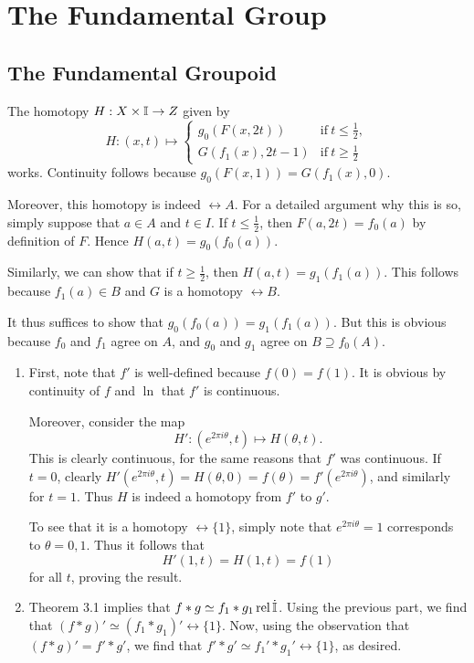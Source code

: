 \documentclass[../../solutions.tex]{subfiles}
\begin{document}
 

\section{The Fundamental Group}
\subsection{The Fundamental Groupoid} 
\begin{exercise} \leavevmode
The homotopy $H:X\times\mathbb I\to Z$ given by \[H:(x,t)\mapsto\begin{cases}g_0(F(x,2t))&\text{if}~t\le\frac12,\\G(f_1(x),2t-1)&\text{if}~t\ge\frac12\end{cases}\] works. Continuity follows because $g_0(F(x,1))=G(f_1(x),0)$. 

Moreover, this homotopy is indeed $\rel A$. For a detailed argument why this is so, simply suppose that $a\in A$ and $t\in I$. If $t\le\frac12$, then $F(a,2t)=f_0(a)$ by definition of $F$. Hence $H(a,t)=g_0(f_0(a))$. 

Similarly, we can show that if $t\ge\frac12$, then $H(a,t)=g_1(f_1(a))$. This follows because $f_1(a)\in B$ and $G$ is a homotopy $\rel B$. 

It thus suffices to show that $g_0(f_0(a))=g_1(f_1(a))$. But this is obvious because $f_0$ and $f_1$ agree on $A$, and $g_0$ and $g_1$ agree on $B\supseteq f_0(A)$. 
\end{exercise} 

\begin{exercise} \leavevmode
\begin{enumerate}
\item First, note that $f'$ is well-defined because $f(0)=f(1)$. It is obvious by continuity of $f$ and $\ln$ that $f'$ is continuous. 

Moreover, consider the map \[H':\left(e^{2\pi i\theta},t\right)\mapsto H(\theta,t).\] This is clearly continuous, for the same reasons that $f'$ was continuous. If $t=0$, clearly $H'(e^{2\pi i\theta},t)=H(\theta,0)=f(\theta)=f'(e^{2\pi i\theta})$, and similarly for $t=1$. Thus $H$ is indeed a homotopy from $f'$ to $g'$. 

To see that it is a homotopy $\rel\{1\}$, simply note that $e^{2\pi i\theta}=1$ corresponds to $\theta=0,1$. Thus it follows that \[H'(1,t)=H(1,t)=f(1)\] for all $t$, proving the result. 

\item Theorem 3.1 implies that $f*g\simeq f_1*g_1\operatorname{rel}\dot{\mathbb I}$. Using the previous part, we find that $(f*g)'\simeq(f_1*g_1)'\rel\{1\}$. Now, using the observation that $(f*g)'=f'*g'$, we find that $f'*g'\simeq f_1'*g_1'\rel\{1\}$, as desired. 
\end{enumerate} 
\end{exercise} 
\end{document}
